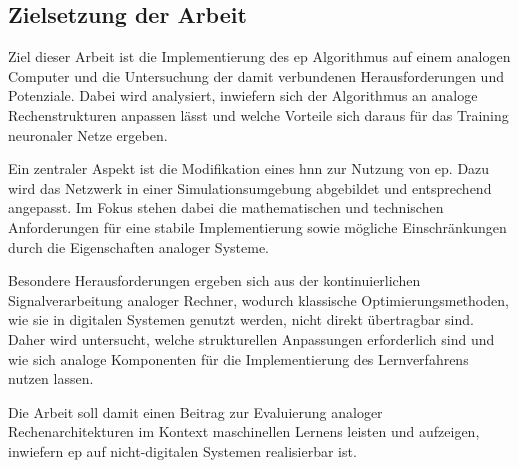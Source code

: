 \subsection{Zielsetzung der Arbeit}

Ziel dieser Arbeit ist die Implementierung des \ac{ep} Algorithmus auf einem analogen Computer und die Untersuchung der damit verbundenen Herausforderungen und Potenziale. Dabei wird analysiert, inwiefern sich der Algorithmus an analoge Rechenstrukturen anpassen lässt und welche Vorteile sich daraus für das Training neuronaler Netze ergeben.

Ein zentraler Aspekt ist die Modifikation eines \ac{hnn} zur Nutzung von \ac{ep}. Dazu wird das Netzwerk in einer Simulationsumgebung abgebildet und entsprechend angepasst. Im Fokus stehen dabei die mathematischen und technischen Anforderungen für eine stabile Implementierung sowie mögliche Einschränkungen durch die Eigenschaften analoger Systeme.

Besondere Herausforderungen ergeben sich aus der kontinuierlichen Signalverarbeitung analoger Rechner, wodurch klassische Optimierungsmethoden, wie sie in digitalen Systemen genutzt werden, nicht direkt übertragbar sind. Daher wird untersucht, welche strukturellen Anpassungen erforderlich sind und wie sich analoge Komponenten für die Implementierung des Lernverfahrens nutzen lassen.

Die Arbeit soll damit einen Beitrag zur Evaluierung analoger Rechenarchitekturen im Kontext maschinellen Lernens leisten und aufzeigen, inwiefern \ac{ep} auf nicht-digitalen Systemen realisierbar ist.
